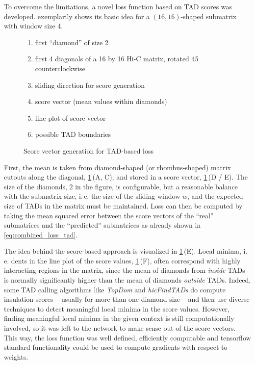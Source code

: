 To overcome the limitations, a novel loss function based on TAD scores \cite{Crane2015} was developed.
 exemplarily shows its basic idea for a $(16,16)$-shaped submatrix
with window size 4.
\begin{figure}[hbt]
 \begin{minipage}{0.65\textwidth}
    \caption{Score vector generation for TAD-based loss}
    \label{fig:improve:tad_score_loss_function}
 \end{minipage}\hfill
 \begin{minipage}{0.3\textwidth}
 \scriptsize
  \begin{enumerate}[label=\Alph*:,leftmargin=*]
   \raggedright
    \item first ``diamond'' of size 2
    \item first 4 diagonals of a 16 by 16 Hi-C matrix, rotated \SI{45}{\deg} counterclockwise
    \item sliding direction for score generation
    \item score vector (mean values within diamonds)
    \item line plot of score vector
    \item possible TAD boundaries
\end{enumerate}
 \end{minipage}
\end{figure}
First, the mean is taken from diamond-shaped (or rhombus-shaped) matrix cutouts along the diagonal, \cref{fig:improve:tad_score_loss_function}\,(A, C),
and stored in a score vector, \cref{fig:improve:tad_score_loss_function}\,(D / E). 
The size of the diamonds, 2 in the figure, is configurable, but a reasonable balance with the submatrix size, i.\,e. the size of the sliding window $w$,
and the expected size of TADs in the matrix must be maintained.
Loss can then be computed by taking the mean squared error between the score vectors of the ``real'' submatrices and the ``predicted'' submatrices
as already shown in \cref{eq:combined_loss_tad}.

The idea behind the score-based approach is visualized in \cref{fig:improve:tad_score_loss_function}\,(E).
Local minima, i.\,e. dents in the line plot of the score values, \cref{fig:improve:tad_score_loss_function}\,(F),
often correspond with highly interacting regions in the matrix, since the mean of diamonds from \emph{inside} TADs is normally significantly higher than the mean of diamonds \emph{outside} TADs.
Indeed, some TAD calling algorithms like \emph{TopDom} \cite{Shin2015} and \emph{hicFindTADs} \cite[W12f.]{Wolff2018} do compute insulation scores -- usually for more than one diamond size -- 
and then use diverse techniques to detect meaningful local minima in the score values.
However, finding meaningful local minima in the given context is still computationally involved,
so it was left to the network to make sense out of the score vectors.
This way, the loss function was well defined, efficiently computable and tensorflow standard functionality could be used to compute gradients with respect to weights.

